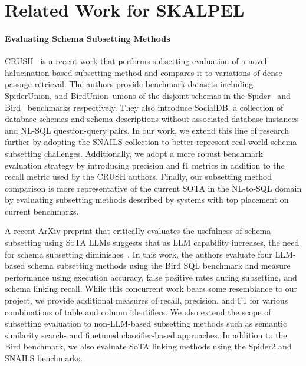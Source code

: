 \section{Related Work for SKALPEL}


\paragraph{\textbf{Evaluating Schema Subsetting Methods}}
CRUSH~\cite{kothyari-etal-2023-crush4sql} is a recent work that performs subsetting evaluation of a novel halucination-based subsetting method and compares it to variations of dense passage retrieval.
The authors provide benchmark datasets including SpiderUnion, and BirdUnion--unions of the disjoint schemas in the Spider~\cite{benchmark-spider} and Bird~\cite{benchmark-bird} benchmarks respectively. They also introduce SocialDB, a collection of database schemas and schema descriptions without associated database instances and NL-SQL question-query pairs.
In our work, we extend this line of research further by adopting the  SNAILS collection to better-represent real-world schema subsetting challenges.
Additionally, we adopt a more robust benchmark evaluation strategy by introducing precision and f1 metrics in addition to the recall metric used by the CRUSH authors.
Finally, our subsetting method comparison is more representative of the current SOTA in the NL-to-SQL domain by evaluating subsetting methods described by systems with top placement on current benchmarks.

A recent ArXiv preprint that critically evaluates the usefulness of schema subsetting using SoTA LLMs suggests that as LLM capability increases, the need for schema subsetting diminishes~\cite{maamari2024deathschemalinkingtexttosql}.
In this work, the authors evaluate four LLM-based schema subsetting methods using the Bird SQL benchmark and measure performance using execution accuracy, false positive rates during subsetting, and schema linking recall.
While this concurrent work bears some resemblance to our \PROJECTNAME{ } project, we provide additional measures of recall, precision, and F1 for various combinations of table and column identifiers.
We also extend the scope of subsetting evaluation to non-LLM-based subsetting methods such as semantic similarity search- and finetuned classifier-based approaches.
In addition to the Bird benchmark, we also evaluate SoTA linking methods using the Spider2 and SNAILS benchmarks.

